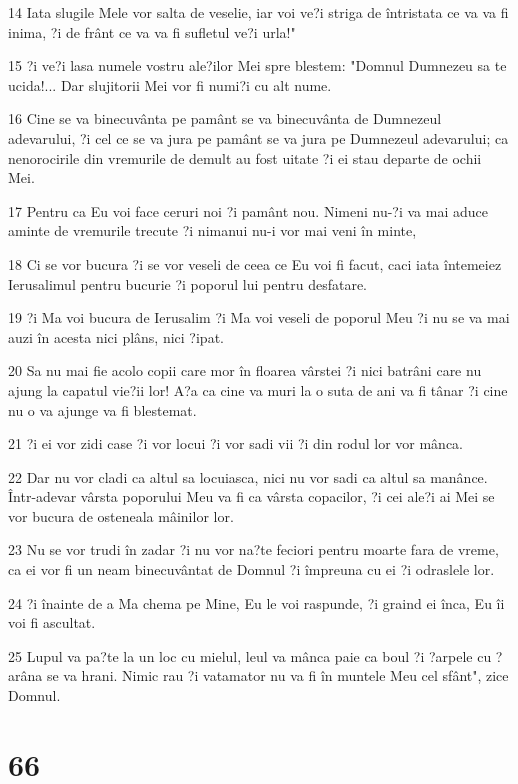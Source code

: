 \par 14 Iata slugile Mele vor salta de veselie, iar voi ve?i striga de întristata ce va va fi inima, ?i de frânt ce va va fi sufletul ve?i urla!"
\par 15 ?i ve?i lasa numele vostru ale?ilor Mei spre blestem: "Domnul Dumnezeu sa te ucida!... Dar slujitorii Mei vor fi numi?i cu alt nume.
\par 16 Cine se va binecuvânta pe pamânt se va binecuvânta de Dumnezeul adevarului, ?i cel ce se va jura pe pamânt se va jura pe Dumnezeul adevarului; ca nenorocirile din vremurile de demult au fost uitate ?i ei stau departe de ochii Mei.
\par 17 Pentru ca Eu voi face ceruri noi ?i pamânt nou. Nimeni nu-?i va mai aduce aminte de vremurile trecute ?i nimanui nu-i vor mai veni în minte,
\par 18 Ci se vor bucura ?i se vor veseli de ceea ce Eu voi fi facut, caci iata întemeiez Ierusalimul pentru bucurie ?i poporul lui pentru desfatare.
\par 19 ?i Ma voi bucura de Ierusalim ?i Ma voi veseli de poporul Meu ?i nu se va mai auzi în acesta nici plâns, nici ?ipat.
\par 20 Sa nu mai fie acolo copii care mor în floarea vârstei ?i nici batrâni care nu ajung la capatul vie?ii lor! A?a ca cine va muri la o suta de ani va fi tânar ?i cine nu o va ajunge va fi blestemat.
\par 21 ?i ei vor zidi case ?i vor locui ?i vor sadi vii ?i din rodul lor vor mânca.
\par 22 Dar nu vor cladi ca altul sa locuiasca, nici nu vor sadi ca altul sa manânce. Într-adevar vârsta poporului Meu va fi ca vârsta copacilor, ?i cei ale?i ai Mei se vor bucura de osteneala mâinilor lor.
\par 23 Nu se vor trudi în zadar ?i nu vor na?te feciori pentru moarte fara de vreme, ca ei vor fi un neam binecuvântat de Domnul ?i împreuna cu ei ?i odraslele lor.
\par 24 ?i înainte de a Ma chema pe Mine, Eu le voi raspunde, ?i graind ei înca, Eu îi voi fi ascultat.
\par 25 Lupul va pa?te la un loc cu mielul, leul va mânca paie ca boul ?i ?arpele cu ?arâna se va hrani. Nimic rau ?i vatamator nu va fi în muntele Meu cel sfânt", zice Domnul.

\chapter{66}

